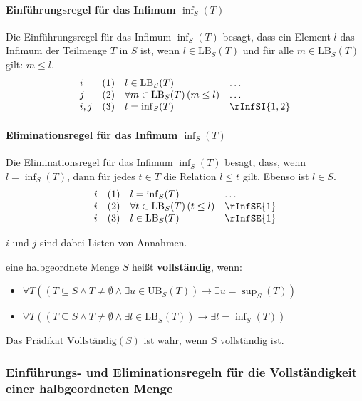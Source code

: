 \documentclass[main.tex]{subfiles}
\begin{document}
\paragraph{Einführungsregel für das Infimum \(\inf_S(T)\)}
Die Einführungsregel für das Infimum \(\inf_S(T)\) besagt, dass ein Element \( l \) das Infimum der Teilmenge \( T \) in \( S \) ist, wenn \( l \in \text{LB}_S(T) \) und für alle \( m \in \text{LB}_S(T) \) gilt: \( m \leq l \).
\[
\begin{array}{llll}
    i   & (1) & l \in \text{LB}_S(T) & \dots \\
    j   & (2) & \forall m \in \text{LB}_S(T) \, (m \leq l) & \dots \\
    i,j & (3) & l = \inf_S(T) & \rInfSI{1,2}
\end{array}
\]

\paragraph{Eliminationsregel für das Infimum \(\inf_S(T)\)}
Die Eliminationsregel für das Infimum \(\inf_S(T)\) besagt, dass, wenn \( l = \inf_S(T) \), dann für jedes \( t \in T \) die Relation \( l \leq t \) gilt. Ebenso ist \( l \in S \).
\[
\begin{array}{llll}
    i & (1) & l = \inf_S(T) & \dots \\
    i & (2) & \forall t \in \text{LB}_S(T) \, (t \leq l) & \rInfSE{1} \\
    i & (3) & l \in \text{LB}_S(T) & \rInfSE{1}
\end{array}
\]

\(i\) und \(j\) sind dabei Listen von Annahmen.

\begin{definition}
    eine halbgeordnete Menge \( S \) heißt \textbf{vollständig}, wenn:
    \begin{itemize}
        \item \(\forall T((T\subseteq S\land T \neq \emptyset\land \exists u \in \text{UB}_S(T)) \rightarrow \exists u = \sup_S(T))\)
        \item \(\forall T((T\subseteq S\land T \neq \emptyset\land \exists l \in \text{LB}_S(T)) \rightarrow \exists l = \inf_S(T))\)
    \end{itemize}
    Das Prädikat \(\text{Vollständig}(S)\) ist wahr, wenn \( S \) vollständig ist.
\end{definition}

\subsubsection{Einführungs- und Eliminationsregeln für die Vollständigkeit einer halbgeordneten Menge}
\label{rule:rCompleteI} \label{rule:rCompleteE}
\end{document}
